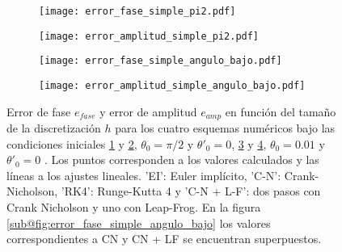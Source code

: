 \documentclass[aps,prb,twocolumn,superscriptaddress,floatfix,longbibliography]{revtex4-2}
\newcounter{para}
\begin{document}



\begin{figure}
  \centering
  \begin{subfigure}[b]{0.45\textwidth}
      \centering
      \texttt{[image: error\_fase\_simple\_pi2.pdf]}
      \caption{\label{fig:error_fase_simple_pi2}}
  \end{subfigure}
  \hfill
  \begin{subfigure}[b]{0.45\textwidth}
      \centering
      \texttt{[image: error\_amplitud\_simple\_pi2.pdf]}
      \caption{\label{fig:error_amplitud_simple_pi2}}
  \end{subfigure}
  \hfill
  \begin{subfigure}[b]{0.45\textwidth}
      \centering
      \texttt{[image: error\_fase\_simple\_angulo\_bajo.pdf]}
      \caption{\label{fig:error_fase_simple_angulo_bajo}}
  \end{subfigure}
  \hfill
  \begin{subfigure}[b]{0.45\textwidth}
      \centering
      \texttt{[image: error\_amplitud\_simple\_angulo\_bajo.pdf]}
      \caption{\label{fig:error_amplitud_simple_angulo_bajo}}
  \end{subfigure}
     \caption{Error de fase $e_{fase}$ y error de amplitud $e_{amp}$ en función del tamaño de la discretización $h$ para los cuatro esquemas numéricos bajo las condiciones iniciales \ref{fig:error_fase_simple_pi2} y \ref{fig:error_amplitud_simple_pi2}, $\theta_0 = \pi/2$ y $\theta'_0 = 0$, \ref{fig:error_fase_simple_angulo_bajo} y \ref{fig:error_amplitud_simple_angulo_bajo}, $\theta_0 = 0.01$ y $\theta'_0 = 0$ . Los puntos corresponden a los valores calculados y las líneas a los ajustes lineales. 'EI': Euler implícito, 'C-N': Crank-Nicholson, 'RK4': Runge-Kutta 4 y 'C-N + L-F': dos pasos con Crank Nicholson y uno con Leap-Frog. En la figura \ref{sub@fig:error_fase_simple_angulo_bajo} los valores correspondientes a CN y CN + LF se encuentran superpuestos.}
     \label{fig:simple_error_vs_h}
\end{figure}
\end{document}
